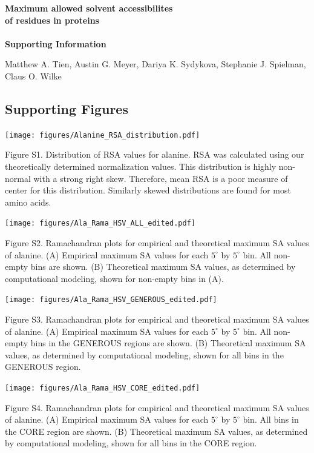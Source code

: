 \documentclass[12pt]{article}
\begin{document}
\begin{center}
\Large\textbf{Maximum allowed solvent accessibilites\\of residues in proteins}\\
\large\mbox{}\\
\textbf{Supporting Information}
\end{center}

\bigskip
\noindent Matthew A. Tien, Austin G. Meyer, Dariya K. Sydykova, Stephanie J. Spielman, Claus O. Wilke

\bigskip

\subsection*{Supporting Figures}
\centerline{\texttt{[image: figures/Alanine\_RSA\_distribution.pdf]}}

\noindent Figure S1. Distribution of RSA values for alanine. RSA was calculated using our theoretically determined normalization values. This distribution is highly non-normal with a strong right skew. Therefore, mean RSA is a poor measure of center for this distribution. Similarly skewed distributions are found for most amino acids.

\newpage
\centerline{\texttt{[image: figures/Ala\_Rama\_HSV\_ALL\_edited.pdf]}}

\noindent Figure S2. Ramachandran plots for empirical and theoretical maximum SA values of alanine. (A) Empirical maximum SA values for each $5^\circ$ by $5^\circ$ bin. All non-empty bins are shown. (B) Theoretical maximum SA values, as determined by computational modeling, shown for non-empty bins in (A).

\vspace*{.5in}

\centerline{\texttt{[image: figures/Ala\_Rama\_HSV\_GENEROUS\_edited.pdf]}}

\noindent Figure S3. Ramachandran plots for empirical and theoretical maximum SA values of alanine. (A) Empirical maximum SA values for each $5^\circ$ by $5^\circ$ bin. All non-empty bins in the GENEROUS regions are shown. (B) Theoretical maximum SA values, as determined by computational modeling, shown for all bins in the GENEROUS region.

\newpage

\centerline{\texttt{[image: figures/Ala\_Rama\_HSV\_CORE\_edited.pdf]}}

\noindent Figure S4. Ramachandran plots for empirical and theoretical maximum SA values of alanine. (A) Empirical maximum SA values for each $5^\circ$ by $5^\circ$ bin. All bins in the CORE region are shown. (B) Theoretical maximum SA values, as determined by computational modeling, shown for all bins in the CORE region.
\end{document}
